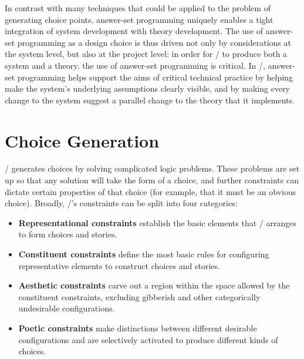 In contrast with many techniques that could be applied to the problem of generating choice points, answer-set programming uniquely enables a tight integration of system development with theory development.
%
The use of answer-set programming as a design choice is thus driven not only by considerations at the system level, but also at the project level: in order for \dunyazad/ to produce both a system and a theory, the use of answer-set programming is critical.
%
In \dunyazad/, answer-set programming helps support the aims of critical technical practice by helping make the system's underlying assumptions clearly visible, and by making every change to the system suggest a parallel change to the theory that it implements.

%


\section{Choice Generation}
\label{sec:dunyazad-choice-generation}%

\dunyazad/ generates choices by solving complicated logic problems.
%
These problems are set up so that any solution will take the form of a choice, and further constraints can dictate certain properties of that choice (for example, that it must be an obvious choice).
%
Broadly, \dunyazad/'s constraints can be split into four categories:

\begin{itemize}
\item \textbf{Representational constraints} establish the basic elements that \dunyazad/ arranges to form choices and stories.
\item \textbf{Constituent constraints} define the most basic rules for configuring representative elements to construct choices and stories.
\item \textbf{Aesthetic constraints} carve out a region within the space allowed by the constituent constraints, excluding gibberish and other categorically undesirable configurations.
\item \textbf{Poetic constraints} make distinctions between different desirable configurations and are selectively activated to produce different kinds of choices.
\end{itemize}

